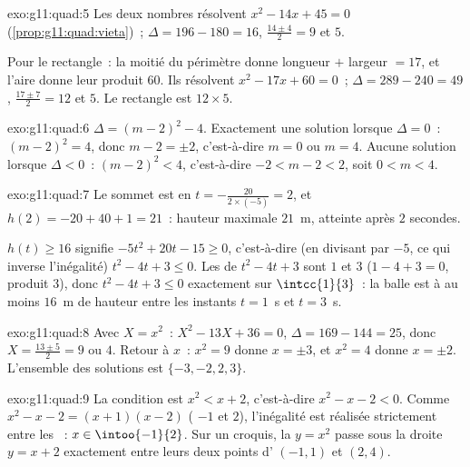 \begin{solution}{exo:g11:quad:5}
Les deux nombres résolvent $x^2 - 14x + 45 = 0$
(\cref{prop:g11:quad:vieta})~; $\Delta = 196 - 180 = 16$, 
$\frac{14 \pm 4}{2} = 9$ et $5$.

Pour le rectangle~: la moitié du périmètre donne longueur $+$ largeur
$= 17$, et l'aire donne leur produit $60$. Ils résolvent
$x^2 - 17x + 60 = 0$~; $\Delta = 289 - 240 = 49$, 
$\frac{17 \pm 7}{2} = 12$ et $5$. Le rectangle est $12 \times 5$.
\end{solution}

\begin{solution}{exo:g11:quad:6}
$\Delta = (m-2)^2 - 4$. Exactement une solution lorsque $\Delta = 0$~:
$(m-2)^2 = 4$, donc $m - 2 = \pm 2$, c'est-à-dire $m = 0$ ou $m = 4$.
Aucune solution lorsque $\Delta < 0$~: $(m-2)^2 < 4$, c'est-à-dire
$-2 < m - 2 < 2$, soit $0 < m < 4$.
\end{solution}

\begin{solution}{exo:g11:quad:7}
Le sommet est en $t = -\frac{20}{2 \times (-5)} = 2$, et
$h(2) = -20 + 40 + 1 = 21$~: hauteur maximale $21$~m, atteinte après
$2$ secondes.

$h(t) \geq 16$ signifie $-5t^2 + 20t - 15 \geq 0$, c'est-à-dire (en
divisant par $-5$, ce qui inverse l'inégalité) $t^2 - 4t + 3 \leq 0$.
Les  de $t^2-4t+3$ sont $1$ et $3$ ($1 - 4 + 3 = 0$, produit
$3$), donc $t^2 - 4t + 3 \leq 0$ exactement sur $\intcc{1}{3}$~: la
balle est à au moins $16$~m de hauteur entre les instants $t = 1$~s et
$t = 3$~s.
\end{solution}

\begin{solution}{exo:g11:quad:8}
Avec $X = x^2$~: $X^2 - 13X + 36 = 0$, $\Delta = 169 - 144 = 25$, donc
$X = \frac{13 \pm 5}{2} = 9$ ou $4$. Retour à $x$~: $x^2 = 9$ donne
$x = \pm 3$, et $x^2 = 4$ donne $x = \pm 2$. L'ensemble des solutions est
$\{-3, -2, 2, 3\}$.
\end{solution}

\begin{solution}{exo:g11:quad:9}
La condition est $x^2 < x + 2$, c'est-à-dire $x^2 - x - 2 < 0$. Comme
$x^2 - x - 2 = (x+1)(x-2)$ ( $-1$ et $2$), l'inégalité est
réalisée strictement entre les ~: $x \in \intoo{-1}{2}$. Sur un
croquis, la  $y = x^2$ passe sous la droite $y = x+2$ exactement
entre leurs deux points d' $(-1, 1)$ et $(2, 4)$.
\end{solution}

